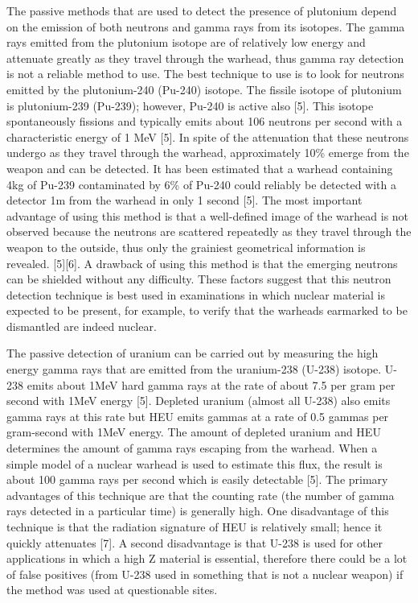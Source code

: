 \documentclass[twocolumn,a4paper]{article}
\begin{document}
The passive methods that are used to detect the presence of plutonium
depend on the emission of both neutrons and gamma rays from its
isotopes. The gamma rays emitted from the plutonium isotope are of
relatively low energy and attenuate greatly as they travel through the
warhead, thus gamma ray detection is not a reliable method to use. The
best technique to use is to look for neutrons emitted by the
plutonium-240 (Pu-240) isotope. The fissile isotope of plutonium is
plutonium-239 (Pu-239); however, Pu-240 is active also [5]. This
isotope spontaneously fissions and typically emits about 106 neutrons
per second with a characteristic energy of 1 MeV [5]. In spite of the
attenuation that these neutrons undergo as they travel through the
warhead, approximately 10\% emerge from the weapon and can be
detected. It has been estimated that a warhead containing 4kg of
Pu-239 contaminated by 6\% of Pu-240 could reliably be detected with a
detector 1m from the warhead in only 1 second [5]. The most important
advantage of using this method is that a well-defined image of the
warhead is not observed because the neutrons are scattered repeatedly
as they travel through the weapon to the outside, thus only the
grainiest geometrical information is revealed. [5][6]. A drawback of
using this method is that the emerging neutrons can be shielded
without any difficulty. These factors suggest that this neutron
detection technique is best used in examinations in which nuclear
material is expected to be present, for example, to verify that the
warheads earmarked to be dismantled are indeed nuclear.

The passive detection of uranium can be carried out by measuring the
high energy gamma rays that are emitted from the uranium-238 (U-238)
isotope. U-238 emits about 1MeV hard gamma rays at the rate of about
7.5 per gram per second with 1MeV energy [5]. Depleted uranium (almost
all U-238) also emits gamma rays at this rate but HEU emits gammas at
a rate of 0.5 gammas per gram-second with 1MeV energy. The amount of
depleted uranium and HEU determines the amount of gamma rays escaping
from the warhead. When a simple model of a nuclear warhead is used to
estimate this flux, the result is about 100 gamma rays per second
which is easily detectable [5]. The primary advantages of this
technique are that the counting rate (the number of gamma rays
detected in a particular time) is generally high. One disadvantage of
this technique is that the radiation signature of HEU is relatively
small; hence it quickly attenuates [7]. A second disadvantage is that
U-238 is used for other applications in which a high Z material is
essential, therefore there could be a lot of false positives (from
U-238 used in something that is not a nuclear weapon) if the method
was used at questionable sites.
\end{document}

